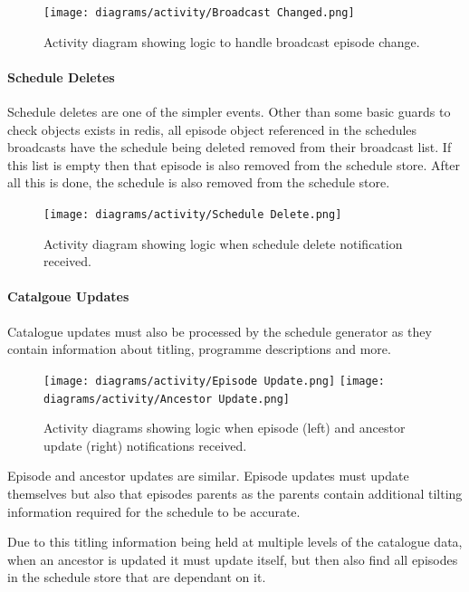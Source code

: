   \begin{figure}[H]
    \centering
    \texttt{[image: diagrams/activity/Broadcast Changed.png]}
    \caption{Activity diagram showing logic to handle broadcast episode change.}
    \label{fig:broadCastChangeActivity}
  \end{figure}

  \paragraph{Schedule Deletes}
  Schedule deletes are one of the simpler events. Other than some basic guards to check objects exists in redis, all episode object referenced in 
  the schedules broadcasts have the schedule being deleted removed from their broadcast list. If this list is empty then that episode is also removed
  from the schedule store. After all this is done, the schedule is also removed from the schedule store.

  \begin{figure}[H]
    \centering
    \texttt{[image: diagrams/activity/Schedule Delete.png]}
    \caption{Activity diagram showing logic when schedule delete notification received.}
    \label{fig:scheduleDeleteActivity}
  \end{figure}

  \paragraph{Catalgoue Updates}
  Catalogue updates must also be processed by the schedule generator as they contain information about titling, programme descriptions and more.


  \begin{figure}[H]
    \centering
    \texttt{[image: diagrams/activity/Episode Update.png]}
    \texttt{[image: diagrams/activity/Ancestor Update.png]}
    \caption{Activity diagrams showing logic when episode (left) and ancestor update (right) notifications received.}
    \label{fig:scheduleUpdateCatalogueActivity}
  \end{figure}

  Episode and ancestor updates are similar. Episode updates must update themselves but also that episodes parents as
  the parents contain additional tilting information required for the schedule to be accurate.

  Due to this titling information being held at multiple levels of the catalogue data, when an ancestor is updated it must update itself,
  but then also find all episodes in the schedule store that are dependant on it.


